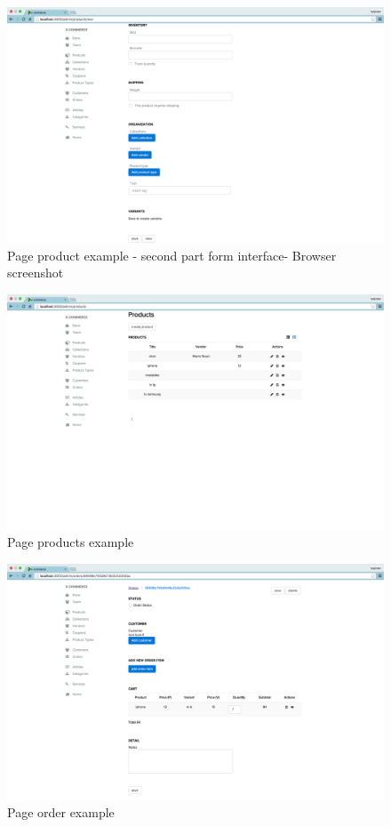\begin{figure}[htb]
\centering
\includegraphics[width=1.0\linewidth]{images/chapter3/prod-part2-all.png}\hfill
\caption[page product second part form browser]{Page product example - second part form interface- Browser screenshot}
\label{fig:design_page}
\end{figure}
\begin{figure}[htb]
\centering
\includegraphics[width=1.0\linewidth]{images/chapter3/page-products-all.png}\hfill
\caption[page products example]{Page products example}
\label{fig:design_page}
\end{figure}
\begin{figure}[htb]
\centering
\includegraphics[width=1.0\linewidth]{images/chapter3/page-order-all.png}\hfill
\caption[page order example]{Page order example}
\label{fig:design_page}
\end{figure}
